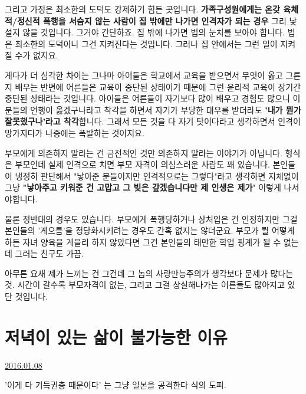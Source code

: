 그리고 가정은 최소한의 도덕도 강제하기 힘든 곳입니다.
\textbf{가족구성원에게는 온갖 육체적/정신적 폭행을 서슴지 않는 사람이}
\textbf{집 밖에만 나가면 인격자가 되는 경우} 그리 낯설지 않을 것입니다.
그거야 간단하죠. 집 밖에 나가면 법의 눈치를 보아야 합니다. 법은 최소한의 도덕이니 그건 지켜진다는 것입니다.
그러나 집 안에서는 그런 일이 지켜질 수가 없지요.
\vspace{5mm}

게다가 더 심각한 차이는
그나마 아이들은 학교에서 교육을 받으면서 무엇이 옳고 그른지 배우는 반면에
어른들은 교육이 중단된 상태이기 때문에 그런 윤리적 교육이 장기간 중단된 상태라는 것입니다.
아이들은 어른들이 자기보다 많이 배우고 경험도 많으니 이 분들의 언행이 옳겠구나라고 착각을 하면서
자기가 부당한 대우를 받더라도 \textbf{'내가 뭔가 잘못했구나'라고 착각}합니다.
그래서 모든 것을 다 자기 탓이다라고 생각하면서 인격이 망가지다가 나중에는 폭발하는 것이지요.
\vspace{5mm}

부모에게 의존하지 말라는 건 금전적인 것만 의존하지 말라는 이야기가 아닙니다.
형식은 부모인데 실제 인격으로 치면 부모 자격이 의심스러운 사람도 꽤 있습니다.
본인들이 냉정히 판단해서 "낳아준 분들이지만 인격적으로는 그렇다"라고 생각하면
지체없이 그냥 \textbf{"낳아주고 키워준 건 고맙고 그 빚은 갚겠습니다만 제 인생은 제가}" 이렇게 나서야합니다.
\vspace{5mm}

물론 정반대의 경우도 있습니다.
부모에게 폭행당하거나 상처입은 건 인정하지만 그걸 본인들의 '게으름'을 정당화시키려는 경우도 간혹 없지는 않더군요.
부모가 뭘 어떻게 하든 자녀 양육을 게을리 하지 않았다면 그건 본인들의 태만한 학업 핑계가 될 수 없는데 그러는 친구도 가끔.
\vspace{5mm}

아무튼 요새 제가 느끼는 건 그건데
그 놈의 사랑만능주의가 생각보다 문제가 많다는 것.
시간이 갈수록 부모자격이 없는, 그리고 그걸 상실해나가는 어른들도 많아지고 있단 것입니다.
\vspace{5mm}





\section{저녁이 있는 삶이 불가능한 이유}
\href{https://www.kockoc.com/Apoc/580015}{2016.01.08}

\vspace{5mm}

'이게 다 기득권층 때문이다'
는 그냥 일본을 공격한다 식의 도피.
\vspace{5mm}

